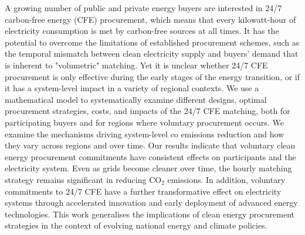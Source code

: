 


A growing number of public and private energy buyers are interested in 24/7 carbon-free energy (CFE) procurement, which means that every kilowatt-hour of electricity consumption is met by carbon-free sources at all times.
It has the potential to overcome the limitations of established procurement schemes, such as the temporal mismatch between clean electricity supply and buyers' demand that is inherent to "volumetric" matching. 
Yet it is unclear whether 24/7 CFE procurement is only effective during the early stages of the energy transition, or if it has a system-level impact in a variety of regional contexts.
We use a mathematical model to systematically examine different designs, optimal procurement strategies, costs, and impacts of the 24/7 CFE matching, both for participating buyers and for regions where voluntary procurement occurs.
We examine the mechanisms driving system-level co emissions reduction and how they vary across regions and over time.
Our results indicate that voluntary clean energy procurement commitments have consistent effects on participants and the electricity system.
Even as grids become cleaner over time, the hourly matching strategy remains significant in reducing CO$_2$ emissions.
In addition, voluntary commitments to 24/7 CFE have a further transformative effect on electricity systems through accelerated innovation and early deployment of advanced energy technologies.
This work generalises the implications of clean energy procurement strategies in the context of evolving national energy and climate policies.




